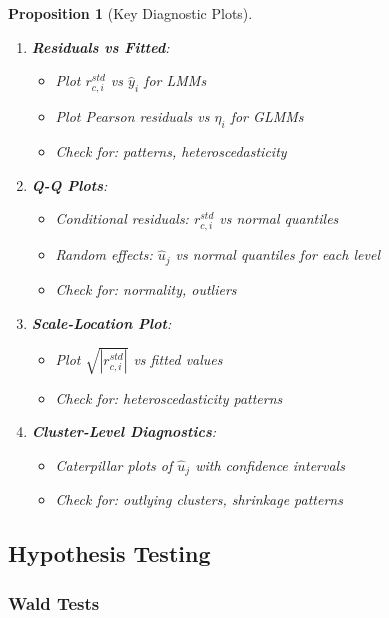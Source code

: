 \documentclass{article}
\newtheorem{proposition}{Proposition}
\begin{document}
\begin{proposition}[Key Diagnostic Plots]
\begin{enumerate}
    \item \textbf{Residuals vs Fitted}: 
    \begin{itemize}
        \item Plot $r_{c,i}^{std}$ vs $\hat{y}_i$ for LMMs
        \item Plot Pearson residuals vs $\hat{\eta}_i$ for GLMMs
        \item Check for: patterns, heteroscedasticity
    \end{itemize}
    
    \item \textbf{Q-Q Plots}:
    \begin{itemize}
        \item Conditional residuals: $r_{c,i}^{std}$ vs normal quantiles
        \item Random effects: $\hat{u}_j$ vs normal quantiles for each level
        \item Check for: normality, outliers
    \end{itemize}
    
    \item \textbf{Scale-Location Plot}:
    \begin{itemize}
        \item Plot $\sqrt{|r_{c,i}^{std}|}$ vs fitted values
        \item Check for: heteroscedasticity patterns
    \end{itemize}
    
    \item \textbf{Cluster-Level Diagnostics}:
    \begin{itemize}
        \item Caterpillar plots of $\hat{u}_j$ with confidence intervals
        \item Check for: outlying clusters, shrinkage patterns
    \end{itemize}
\end{enumerate}
\end{proposition}

\subsection{Hypothesis Testing}

\subsubsection{Wald Tests}
\end{document}
